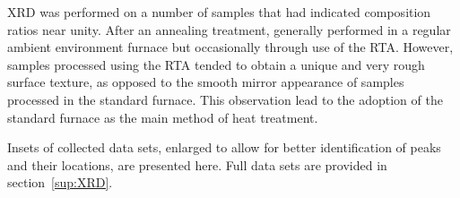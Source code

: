 XRD was performed on a number of samples that had indicated composition ratios near unity. After an annealing treatment, generally performed in a regular ambient environment furnace but occasionally through use of the RTA. However, samples processed using the RTA tended to obtain a unique and very rough surface texture, as opposed to the smooth mirror appearance of samples processed in the standard furnace. This observation lead to the adoption of the standard furnace as the main method of heat treatment. 

Insets of collected data sets, enlarged to allow for better identification of peaks and their locations, are presented here. Full data sets are provided in section~\vref{sup:XRD}. 



















